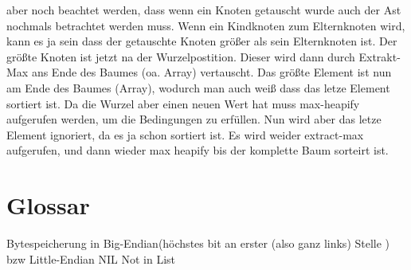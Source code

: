 \documentclass[a4paper]{scrartcl}
\begin{document}
            aber noch beachtet werden, dass wenn ein Knoten getauscht wurde auch der Ast nochmals betrachtet werden muss. Wenn ein Kindknoten zum Elternknoten wird, kann
            es ja sein dass der getauschte Knoten größer als sein Elternknoten ist. Der größte Knoten ist jetzt na der Wurzelpostition. Dieser wird dann durch Extrakt-Max
            ans Ende des Baumes (oa. Array) vertauscht. Das größte Element ist nun am Ende des Baumes (Array), wodurch man auch weiß dass das letze Element sortiert ist.
            Da die Wurzel aber einen neuen Wert hat muss max-heapify aufgerufen werden, um die Bedingungen zu erfüllen. Nun wird aber das letze Element ignoriert, da es ja
            schon sortiert ist. Es wird weider extract-max aufgerufen, und dann wieder max heapify bis der komplette Baum sorteirt ist.  
    \section{Glossar}
        Bytespeicherung in Big-Endian(höchstes bit an erster (also  ganz links) Stelle ) bzw Little-Endian
        NIL Not in List
\end{document}
